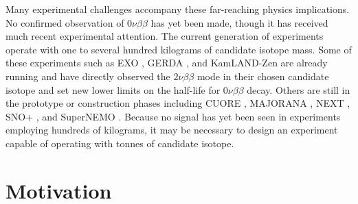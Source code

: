 \documentclass{JINST}
\begin{document}
Many experimental challenges accompany these far-reaching physics implications.  No confirmed observation of
$0\nu\beta\beta$ has yet been made, though it has received much recent experimental attention.   The current 
generation of experiments operate with one to several hundred kilograms of candidate isotope mass.  Some of these
experiments such as EXO \cite{EXO_2012, EXOPRL_2012}, GERDA \cite{GERDA_2004, GERDA_2013}, and KamLAND-Zen 
\cite{KamLANDZen_2012, KamLANDZen_2013} are already running and have directly observed the $2\nu\beta\beta$ 
mode in their chosen candidate isotope and set new lower limits on the half-life for $0\nu\beta\beta$ decay.  Others are 
still in the prototype or construction phases including CUORE \cite{CUORE_2015}, MAJORANA \cite{MAJORANA_2013}, 
NEXT \cite{NEXT_2014}, SNO$+$ \cite{SNOPLUS_2014}, and SuperNEMO \cite{SuperNEMO_2010}.  Because no signal
has yet been seen in experiments employing hundreds of kilograms, it may be necessary to design an experiment capable 
of operating with tonnes of candidate isotope.  


\section{Motivation}
\end{document}

